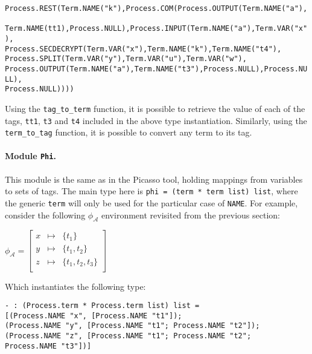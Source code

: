 \documentclass[10pt,a4paper,final,oneside,fleqn]{book}
\begin{document}
\noindent
\texttt{Process.REST(Term.NAME("k"),Process.COM(Process.OUTPUT(Term.NAME("a"),}\\
\texttt{ Term.NAME(tt1),Process.NULL),Process.INPUT(Term.NAME("a"),Term.VAR("x"),}\\
\texttt{Process.SECDECRYPT(Term.VAR("x"),Term.NAME("k"),Term.NAME("t4"),}\\
\texttt{Process.SPLIT(Term.VAR("y"),Term.VAR("u"),Term.VAR("w"),}\\
\texttt{Process.OUTPUT(Term.NAME("a"),Term.NAME("t3"),Process.NULL),Process.NULL),}\\
\texttt{Process.NULL))))}\vspace{4mm}

\noindent
Using the \texttt{tag\_to\_term} function, it is possible to retrieve the value of each of the tags, \texttt{tt1}, \texttt{t3} and \texttt{t4} included in the above type instantiation.  Similarly, using the \texttt{term\_to\_tag} function, it is possible to convert any term to its tag.

\paragraph{Module \texttt{Phi}.} This module is the same as in the Picasso tool, holding mappings from variables to sets of tags.  The main type here is \texttt{phi = (term * term list) list}, where the generic \texttt{term} will only be used for the particular case of \texttt{NAME}.  For example, consider the following $\phi_\mathcal{A}$ environment revisited from the previous section:\vspace{4mm}

\noindent
$\phi_\mathcal{A}=\left[\begin{array}{lcr}
x&\mapsto&\{t_1\}\\
y&\mapsto&\{t_1,t_2\}\\
z&\mapsto&\{t_1,t_2,t_3\}\\
\end{array}\right]$\vspace{4mm}

\noindent
Which instantiates the following type:\vspace{4mm}

\noindent
\texttt{- : (Process.term * Process.term list) list =}\\
\texttt{[(Process.NAME "x", [Process.NAME "t1"]);}\\
\texttt{(Process.NAME "y", [Process.NAME "t1"; Process.NAME "t2"]);}\\
\texttt{(Process.NAME "z", [Process.NAME "t1"; Process.NAME "t2";}\\\texttt{Process.NAME "t3"])]}
\end{document}
